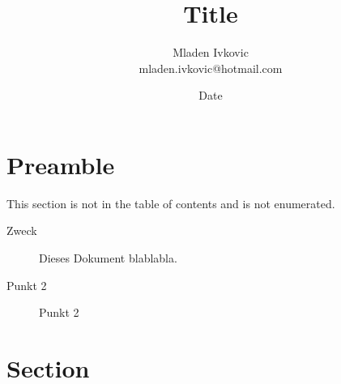 \documentclass[12pt, a4paper, twopage]{scrartcl}
\title{Title}
\author{Mladen Ivkovic\\
mladen.ivkovic@hotmail.com\\
}
\date{Date}
\begin{document}
		
		
		
		






\maketitle
\clearpage

\tableofcontents %
\clearpage







\section*{Preamble}

This section is not in the table of contents and is not enumerated.


\begin{description}
  \item[Zweck] Dieses Dokument blablabla.
  \item[Punkt 2] Punkt 2
\end{description}


\clearpage




















\section{Section}





\end{document}
